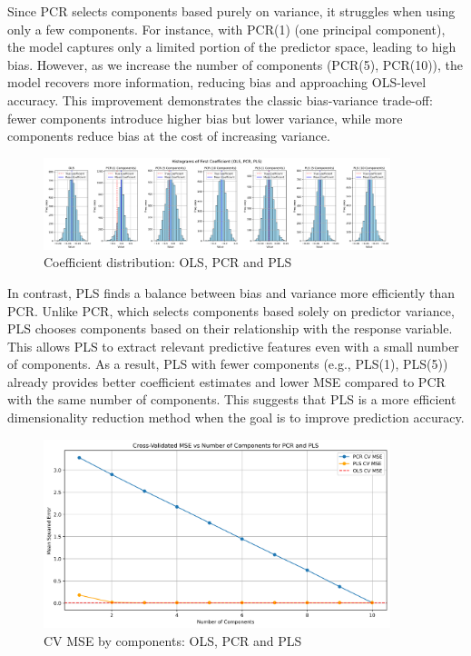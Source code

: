 \documentclass[11pt,twoside,a4paper]{article}
\begin{document}
Since PCR selects components based purely on variance, it struggles when using only a few components. For instance, with PCR(1) (one principal component), the model captures only a limited portion of the predictor space, leading to high bias. However, as we increase the number of components (PCR(5), PCR(10)), the model recovers more information, reducing bias and approaching OLS-level accuracy. This improvement demonstrates the classic bias-variance trade-off: fewer components introduce higher bias but lower variance, while more components reduce bias at the cost of increasing variance.  


\begin{figure}[H]
    \centering
    \includegraphics[width=0.9\textwidth]{Fourth_plot.png}
    \caption{Coefficient distribution: OLS, PCR and PLS}
    \label{fig:PLS_analysis}
\end{figure}

In contrast, PLS finds a balance between bias and variance more efficiently than PCR. Unlike PCR, which selects components based solely on predictor variance, PLS chooses components based on their relationship with the response variable. This allows PLS to extract relevant predictive features even with a small number of components. As a result, PLS with fewer components (e.g., PLS(1), PLS(5)) already provides better coefficient estimates and lower MSE compared to PCR with the same number of components. This suggests that PLS is a more efficient dimensionality reduction method when the goal is to improve prediction accuracy.

\begin{figure}[H]
    \centering
    \includegraphics[width=0.9\textwidth]{Second_plot.png}
    \caption{CV MSE by components: OLS, PCR and PLS}
    \label{fig:PLS_analysis}
\end{figure}
\end{document}
